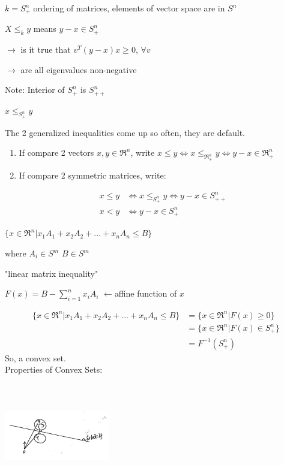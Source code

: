 \begin{example}
	$k = S^n_+$ ordering of matrices, elements of vector space are in $S^n$
	
	$X\leq_k y$ means $y-x\in S^n_+	$
	
	$\rightarrow$ is it true that $v^T(y-x)x \geq 0$, $\forall v$
	
	$\rightarrow$ are all eigenvalues non-negative
	
	Note: Interior of $S_+^n$ is $S^n_{++}$
	
	$x\leq_{S^n_+}y$
\end{example}

The 2 generalized inequalities come up so often, they are default.

\begin{enumerate}
	\item If compare 2 vectors $x,y\in \Re^n$, write $x\leq  y\Leftrightarrow x\leq_{\Re^n_{+}}y \Leftrightarrow y-x\in \Re^n_{+}$ 
	
	\item If compare 2 symmetric matrices, write:
	
	\begin{align*}
	x\leq y &\Leftrightarrow x\leq_{S_+^n} y\Leftrightarrow y - x\in S^n_{++}\\
	x< y &\Leftrightarrow y - x\in S^n_{+}
	\end{align*}
\end{enumerate}

\begin{example}
	$\{x\in \Re^n | x_1A_1 + x_2A_2 + ... + x_nA_n \leq B\}$
\end{example}

where $A_i\in S^m$ $B\in S^m$

"linear matrix inequality"

$F(x) = B - \sum^n_{i=1}x_iA_i$ $\leftarrow$affine function of $x$

\begin{align*}
\{x\in \Re^n | x_1A_1 + x_2A_2 + ... + x_nA_n \leq B\}
 &= \{x\in \Re^n | F(x)\geq 0\}\\
 &= \{x\in \Re^n | F(x)\in S^n_+ \}\\
 &=F^{-1}(S^n_+)
\end{align*}
So, a convex set.\\


Properties of Convex Sets:


\begin{marginfigure}
	\centering
	\includegraphics[width=1.8in,height=1.8in]{figures/ch08/figure1030_2.png}
\end{marginfigure}


